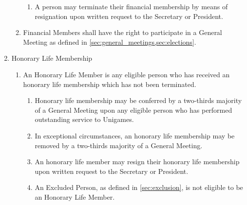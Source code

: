 \documentclass[a4paper]{article}
\begin{document}
\begin{enumerate}
\begin{enumerate}
\begin{enumerate}
                        \item A person may terminate their financial membership by means of resignation upon written request to the Secretary or President.
                    \end{enumerate}
              \item Financial Members shall have the right to participate in a General Meeting as defined in \cref{sec:general_meetings,sec:elections}.
          \end{enumerate}
    \item Honorary Life Membership
          \begin{enumerate}
              \item An Honorary Life Member is any eligible person who has received an honorary life membership which has not been terminated.
                    \begin{enumerate}
                        \item Honorary life membership may be conferred by a two-thirds majority of a General Meeting upon any eligible person who has performed outstanding service to Unigames.
                        \item In exceptional circumstances, an honorary life membership may be removed by a two-thirds majority of a General Meeting.
                        \item An honorary life member may resign their honorary life membership upon written request to the Secretary or President.
                        \item An Excluded Person, as defined in \cref{sec:exclusion}, is not eligible to be an Honorary Life Member.
                    \end{enumerate}
          \end{enumerate}
\end{enumerate}
\end{document}
